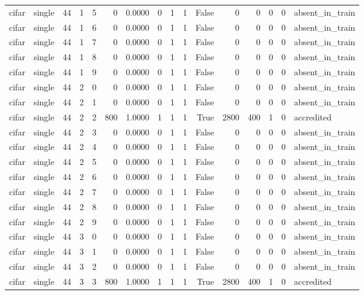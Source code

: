 \begin{tabular}{llrrrrrrrrrrrrrl}
cifar & single & 44 & 1 & 5 & 0 & 0.0000 & 0 & 1 & 1 & False & 0 & 0 & 0 & 0 & absent\_in\_train \\
cifar & single & 44 & 1 & 6 & 0 & 0.0000 & 0 & 1 & 1 & False & 0 & 0 & 0 & 0 & absent\_in\_train \\
cifar & single & 44 & 1 & 7 & 0 & 0.0000 & 0 & 1 & 1 & False & 0 & 0 & 0 & 0 & absent\_in\_train \\
cifar & single & 44 & 1 & 8 & 0 & 0.0000 & 0 & 1 & 1 & False & 0 & 0 & 0 & 0 & absent\_in\_train \\
cifar & single & 44 & 1 & 9 & 0 & 0.0000 & 0 & 1 & 1 & False & 0 & 0 & 0 & 0 & absent\_in\_train \\
cifar & single & 44 & 2 & 0 & 0 & 0.0000 & 0 & 1 & 1 & False & 0 & 0 & 0 & 0 & absent\_in\_train \\
cifar & single & 44 & 2 & 1 & 0 & 0.0000 & 0 & 1 & 1 & False & 0 & 0 & 0 & 0 & absent\_in\_train \\
cifar & single & 44 & 2 & 2 & 800 & 1.0000 & 1 & 1 & 1 & True & 2800 & 400 & 1 & 0 & accredited \\
cifar & single & 44 & 2 & 3 & 0 & 0.0000 & 0 & 1 & 1 & False & 0 & 0 & 0 & 0 & absent\_in\_train \\
cifar & single & 44 & 2 & 4 & 0 & 0.0000 & 0 & 1 & 1 & False & 0 & 0 & 0 & 0 & absent\_in\_train \\
cifar & single & 44 & 2 & 5 & 0 & 0.0000 & 0 & 1 & 1 & False & 0 & 0 & 0 & 0 & absent\_in\_train \\
cifar & single & 44 & 2 & 6 & 0 & 0.0000 & 0 & 1 & 1 & False & 0 & 0 & 0 & 0 & absent\_in\_train \\
cifar & single & 44 & 2 & 7 & 0 & 0.0000 & 0 & 1 & 1 & False & 0 & 0 & 0 & 0 & absent\_in\_train \\
cifar & single & 44 & 2 & 8 & 0 & 0.0000 & 0 & 1 & 1 & False & 0 & 0 & 0 & 0 & absent\_in\_train \\
cifar & single & 44 & 2 & 9 & 0 & 0.0000 & 0 & 1 & 1 & False & 0 & 0 & 0 & 0 & absent\_in\_train \\
cifar & single & 44 & 3 & 0 & 0 & 0.0000 & 0 & 1 & 1 & False & 0 & 0 & 0 & 0 & absent\_in\_train \\
cifar & single & 44 & 3 & 1 & 0 & 0.0000 & 0 & 1 & 1 & False & 0 & 0 & 0 & 0 & absent\_in\_train \\
cifar & single & 44 & 3 & 2 & 0 & 0.0000 & 0 & 1 & 1 & False & 0 & 0 & 0 & 0 & absent\_in\_train \\
cifar & single & 44 & 3 & 3 & 800 & 1.0000 & 1 & 1 & 1 & True & 2800 & 400 & 1 & 0 & accredited \\

\end{tabular}
